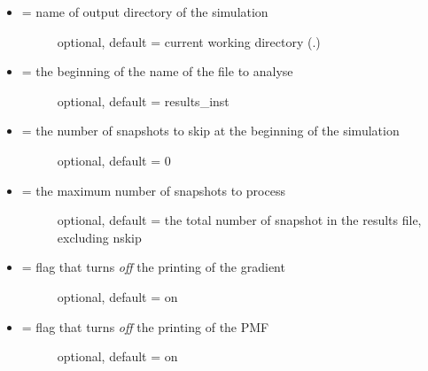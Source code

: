 \documentclass[letterpaper,10pt,english]{sphinxmanual}
\begin{document}
\begin{itemize}
\item {} \begin{description}
\item[{ = name of output directory of the simulation}] \leavevmode
optional, default = current working directory (.)

\end{description}

\item {} \begin{description}
\item[{ = the beginning of the name of the file to analyse}] \leavevmode
optional, default = results\_inst

\end{description}

\item {} \begin{description}
\item[{ = the number of snapshots to skip at the beginning of the simulation}] \leavevmode
optional, default = 0

\end{description}

\item {} \begin{description}
\item[{ = the maximum number of snapshots to process}] \leavevmode
optional, default = the total number of snapshot in the results file, excluding nskip

\end{description}

\item {} \begin{description}
\item[{  = flag that turns \emph{off} the printing of the gradient}] \leavevmode
optional, default = on

\end{description}

\item {} \begin{description}
\item[{  = flag that turns \emph{off} the printing of the PMF}] \leavevmode
optional, default = on


\end{description}
\end{itemize}
\end{document}
